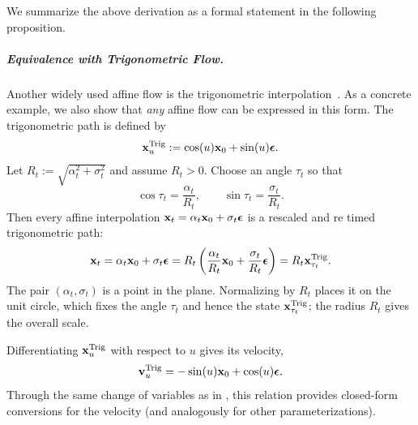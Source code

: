 We summarize the above derivation as a formal statement in the following proposition.

\subparagraph{Equivalence with Trigonometric Flow.}
Another widely used affine flow is the trigonometric interpolation~\citep{salimans2021progressive,albergo2023stochastic,lu2024simplifying}. 
As a concrete example, we also show that \emph{any} affine flow can be expressed in this form. 
The trigonometric path is defined by
\begin{align}\label{eq:trig-para}
{\mathbf{x}}^{\mathrm{Trig}}_u := \cos(u) {\mathbf{x}}_0 + \sin(u){\bm{\epsilon}} .
\end{align}
Let $R_t := \sqrt{\alpha_t^2 + \sigma_t^2}$ and assume $R_t>0$. Choose an angle $\tau_t$ so that
\[
\cos \tau_t = \frac{\alpha_t}{R_t},
\qquad
\sin \tau_t = \frac{\sigma_t}{R_t}.
\]
Then every affine interpolation ${\mathbf{x}}_t=\alpha_t{\mathbf{x}}_0+\sigma_t{\bm{\epsilon}}$ is a rescaled and re timed trigonometric path:
\begin{align}\label{eq:any-to-trig}
{\mathbf{x}}_t
= \alpha_t{\mathbf{x}}_0+\sigma_t{\bm{\epsilon}}
= R_t \left(\frac{\alpha_t}{R_t}{\mathbf{x}}_0+\frac{\sigma_t}{R_t}{\bm{\epsilon}}\right)
= R_t {\mathbf{x}}^{\mathrm{Trig}}_{\tau_t}.
\end{align}
The pair $(\alpha_t,\sigma_t)$ is a point in the plane. Normalizing by $R_t$ places it on the unit circle, which fixes the angle $\tau_t$ and hence the state ${\mathbf{x}}^{\mathrm{Trig}}_{\tau_t}$; the radius $R_t$ gives the overall scale.

Differentiating ${\mathbf{x}}^{\mathrm{Trig}}_u$ with respect to $u$ gives its velocity,  
\[
{\mathbf{v}}^{\mathrm{Trig}}_u = -\sin(u) {\mathbf{x}}_0 + \cos(u) {\bm{\epsilon}}.
\]
Through the same change of variables as in , this relation provides closed-form conversions for the velocity (and analogously for other parameterizations).



